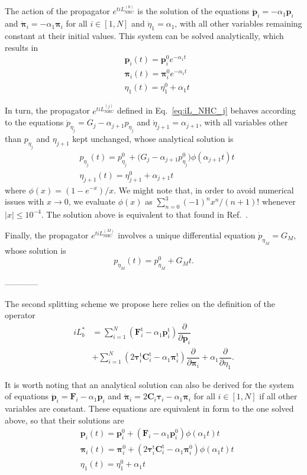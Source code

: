 \documentclass[aip,jcp,reprint,amsmath,amssymb]{revtex4-1}
\newcommand{\mt}[1]{\boldsymbol{\mathbf{#1}}}           %
\newcommand{\vt}[1]{\boldsymbol{\mathbf{#1}}}           %
\newcommand{\tr}[1]{#1^\text{t}}                        %
\newcommand{\diff}[2]{\dfrac{\partial #1}{\partial #2}} %
\begin{document}
The action of the propagator $e^{t i\!L_\text{NHC}^{(0)}}$ is the solution of the equations $\dot{\vt p}_i = -\alpha_1 \vt p_i$ and $\dot{\vt \pi}_i = -\alpha_1 \vt \pi_i$ for all $i \in [1,N]$ and $\dot{\eta}_1 = \alpha_1$, with all other variables remaining constant at their initial values. This system can be solved analytically, which results in
\begin{align*}
&\vt p_i(t) = \vt p_i^0 e^{-\alpha_1 t} \\
&\vt \pi_i(t) = \vt \pi_i^0 e^{-\alpha_1 t} \\
&\eta_1(t) = \eta_1^0 + \alpha_1 t
\end{align*}

In turn, the propagator $e^{t i\!L_\text{NHC}^{(j)}}$ defined in Eq.~\ref{eq:iL_NHC_j} behaves according to the equations $\dot{p}_{\eta_j} = G_j - \alpha_{j+1} p_{\eta_j}$ and $\dot{\eta}_{j+1} = \alpha_{j+1}$, with all variables other than $p_{\eta_j}$ and $\eta_{j+1}$ kept unchanged, whose analytical solution is
\begin{align*}
&p_{\eta_j}(t) = p_{\eta_j}^0 + \Big( G_j - \alpha_{j+1} p_{\eta_j}^0 \Big) \phi\left(\alpha_{j+1} t\right) t \\
&\eta_{j+1}(t) = \eta_{j+1}^0 + \alpha_{j+1} t
\end{align*}
where $\phi(x) = (1-e^{-x})/x$. We might note that, in order to avoid numerical issues with $x \rightarrow 0$, we evaluate $\phi(x)$ as $\sum_{n=0}^3 {(-1)^n x^n}/{(n+1)!}$ whenever $|x| \leq 10^{-4}$. The solution above is equivalent to that found in Ref.~.

Finally, the propagator $e^{t i\!L_\text{NHC}^{(M)}}$ involves a unique differential equation $\dot{p}_{\eta_M} = G_M$, whose solution is
\[
p_{\eta_M}(t) = p_{\eta_M}^0 + G_M t.
\]

------------

The second splitting scheme we propose here relies on the definition of the operator
\begin{align*}
i\!L_b^\ast &= \sum_{i=1}^N \left( \tr{\vt F}_i - \alpha_1 \tr{\vt p}_i \right) \diff{}{\vt p_i} \\
&+ \sum_{i=1}^N \left(2 \tr{\vt \tau}_i \tr{\mt C}_i - \alpha_1 \tr{\vt \pi}_i \right) \diff{}{\vt \pi_i} + \alpha_1 \diff{}{\eta_1}.
\end{align*}



It is worth noting that an analytical solution can also be derived for the system of equations $\dot{\vt p}_i = {\vt F}_i - \alpha_1 \vt p_i$ and $\dot{\vt \pi}_i = 2 \mt C_i \vt \tau_i - \alpha_1 \vt \pi_i$ for all $i \in [1,N]$ if all other variables are constant. These equations are equivalent in form to the one solved above, so that their solutions are
\begin{align*}
&{\vt p}_i(t) = {\vt p}_i^0 + \left({\vt F}_i - \alpha_1 {\vt p}_i^0 \right) \phi\left(\alpha_1 t \right) t \\
&{\vt \pi}_i(t) = {\vt \pi}_i^0 + \left(2 \tr{\vt \tau}_i \tr{\mt C}_i - \alpha_1 {\vt \pi}_i^0 \right) \phi\left(\alpha_1 t \right) t \\
&\eta_1(t) = \eta_1^0 + \alpha_1 t
\end{align*}
\end{document}
